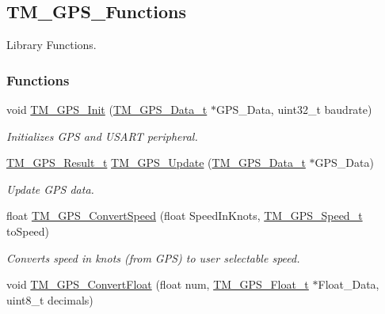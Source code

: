 \hypertarget{group___t_m___g_p_s___functions}{}\subsection{T\+M\+\_\+\+G\+P\+S\+\_\+\+Functions}
\label{group___t_m___g_p_s___functions}


Library Functions.  


\subsubsection*{Functions}
\begin{DoxyCompactItemize}
\item 
void \hyperlink{group___t_m___g_p_s___functions_gaa1e7909c24c99c907d5edcd688b8cdcb}{T\+M\+\_\+\+G\+P\+S\+\_\+\+Init} (\hyperlink{struct_t_m___g_p_s___data__t}{T\+M\+\_\+\+G\+P\+S\+\_\+\+Data\+\_\+t} $\ast$G\+P\+S\+\_\+\+Data, uint32\+\_\+t baudrate)
\begin{DoxyCompactList}\small\item\em Initializes G\+P\+S and U\+S\+A\+R\+T peripheral. \end{DoxyCompactList}\item 
\hyperlink{group___t_m___g_p_s___typedefs_gaf3a9184315a145cb8288691c9c529427}{T\+M\+\_\+\+G\+P\+S\+\_\+\+Result\+\_\+t} \hyperlink{group___t_m___g_p_s___functions_ga31b1673ec7171ea8c552afddaa8e5bb6}{T\+M\+\_\+\+G\+P\+S\+\_\+\+Update} (\hyperlink{struct_t_m___g_p_s___data__t}{T\+M\+\_\+\+G\+P\+S\+\_\+\+Data\+\_\+t} $\ast$G\+P\+S\+\_\+\+Data)
\begin{DoxyCompactList}\small\item\em Update G\+P\+S data. \end{DoxyCompactList}\item 
float \hyperlink{group___t_m___g_p_s___functions_gaa9fb934f21d0fb34dab7a672497826c6}{T\+M\+\_\+\+G\+P\+S\+\_\+\+Convert\+Speed} (float Speed\+In\+Knots, \hyperlink{group___t_m___g_p_s___typedefs_ga287710c2af22ad207c305aeb2e6ea69c}{T\+M\+\_\+\+G\+P\+S\+\_\+\+Speed\+\_\+t} to\+Speed)
\begin{DoxyCompactList}\small\item\em Converts speed in knots (from G\+P\+S) to user selectable speed. \end{DoxyCompactList}\item 
void \hyperlink{group___t_m___g_p_s___functions_gaad0f22897c6acf1b2530a6547b39b0d9}{T\+M\+\_\+\+G\+P\+S\+\_\+\+Convert\+Float} (float num, \hyperlink{struct_t_m___g_p_s___float__t}{T\+M\+\_\+\+G\+P\+S\+\_\+\+Float\+\_\+t} $\ast$Float\+\_\+\+Data, uint8\+\_\+t decimals)

\end{DoxyCompactItemize}

